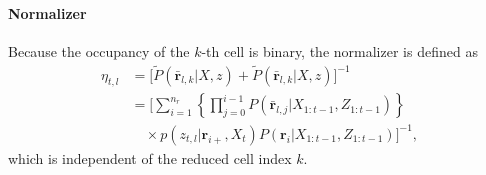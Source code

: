 \documentclass[letterpaper, 10pt, conference]{ieeeconf}
\begin{document}
\begin{appendix}
\paragraph{Normalizer}
Because the occupancy of the $k$-th cell is binary, the normalizer is defined as
\begin{align}
\eta_{t,l}&=\bigg[\tilde P(\bar{\mathbf{r}}_{l,k}|X,z)+\tilde P(\bar{\mathbf{r}}_{l,k}|X,z)\bigg]^{-1}\nonumber\\
&=\bigg[\sum_{i=1}^{n_r}\left\{\prod_{j=0}^{i-1}P(\bar{\mathbf{r}}_{l,j}|X_{1:t-1},Z_{1:t-1})\right\}\nonumber\\&\quad\times p(z_{t,l}|\mathbf{r}_{i+},X_t)P(\mathbf{r}_i|X_{1:t-1},Z_{1:t-1})\bigg]^{-1},
\end{align}
which is independent of the reduced cell index $k$.


\end{appendix}





\end{document}

